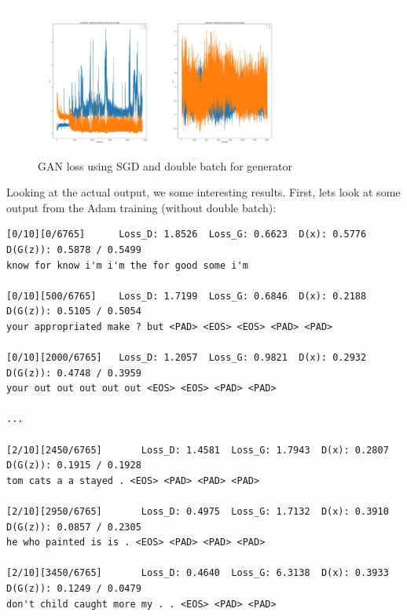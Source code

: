 \documentclass{article}
\begin{document}
\begin{figure}[ht]
    \begin{minipage}{0.45\textwidth}
        \captionsetup{width=0.8\textwidth}
        \includegraphics[width=\textwidth, height=5cm]{GAN-loss-double_batch-Adam.png}
        \caption{%
            GAN loss using Adam and double batch for generator
        }\label{fig:ganLossAdamDoubleBatch}
    \end{minipage}
    \begin{minipage}{0.45\textwidth}
        \captionsetup{width=0.8\textwidth}
        \includegraphics[width=\textwidth, height=5cm]{GAN-loss-double_batch-SGD.png}
        \caption{%
            GAN loss using SGD and double batch for generator
        }\label{fig:ganLossSGDDoubleBatch}
    \end{minipage}
\end{figure}

Looking at the actual output, we some interesting results. First, lets look at
some output from the Adam training (without double batch):

\begin{verbatim}
[0/10][0/6765]      Loss_D: 1.8526  Loss_G: 0.6623  D(x): 0.5776    D(G(z)): 0.5878 / 0.5499
know for know i'm i'm the for good some i'm

[0/10][500/6765]    Loss_D: 1.7199  Loss_G: 0.6846  D(x): 0.2188    D(G(z)): 0.5105 / 0.5054
your appropriated make ? but <PAD> <EOS> <EOS> <PAD> <PAD>

[0/10][2000/6765]   Loss_D: 1.2057  Loss_G: 0.9821  D(x): 0.2932    D(G(z)): 0.4748 / 0.3959
your out out out out out <EOS> <EOS> <PAD> <PAD>

...

[2/10][2450/6765]       Loss_D: 1.4581  Loss_G: 1.7943  D(x): 0.2807    D(G(z)): 0.1915 / 0.1928
tom cats a a stayed . <EOS> <PAD> <PAD> <PAD>

[2/10][2950/6765]       Loss_D: 0.4975  Loss_G: 1.7132  D(x): 0.3910    D(G(z)): 0.0857 / 0.2305
he who painted is is . <EOS> <PAD> <PAD> <PAD>

[2/10][3450/6765]       Loss_D: 0.4640  Loss_G: 6.3138  D(x): 0.3933    D(G(z)): 0.1249 / 0.0479
don't child caught more my . . <EOS> <PAD> <PAD>
\end{verbatim}
\end{document}
